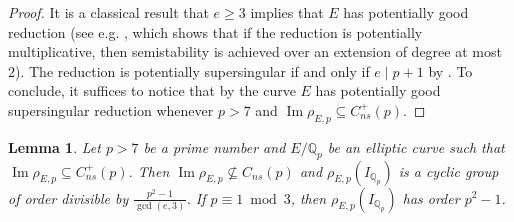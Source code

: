 \documentclass{amsart}
\newtheorem{lemma}[theorem]{Lemma}
\theoremstyle{definition}
\newcommand{\Q}{\mathbb{Q}}
\newcommand{\NRep}[1]{\operatorname{Im}\rho_{E,#1}}
\newcommand{\GoodReductionExtension}{K}
\numberwithin{theorem}{section}
\numberwithin{equation}{section}
\begin{document}
\begin{proof}
    It is a classical result that $e \geq 3$ implies that $E$ has potentially good reduction (see e.g. \cite[Theorem C.14.1(d)]{MR2514094}, which shows that if the reduction is potentially multiplicative, then semistability is achieved over an extension of degree at most $2$). The reduction is potentially supersingular if and only if $e \mid p+1$ by \cite[Remarque 2 on p.~112]{Volkov}.
    To conclude, it suffices to notice that by  the curve $E$ has potentially good supersingular reduction whenever $p>7$ and $\operatorname{Im}\rho_{E,p} \subseteq C_{ns}^+(p)$.
\end{proof}


\begin{lemma}\label{lemma: G(p) is not in the Cartan}
Let $p>7$ be a prime number and $E/\Q_p$ be an elliptic curve such that $\NRep{p} \subseteq C_{ns}^+(p)$. Then 
    $\NRep{p} \not\subseteq C_{ns}(p)$ and $\rho_{E, p}(I_{\Q_p})$ is a cyclic group of order divisible by $\frac{p^2-1}{\gcd(e, 3)}$. If $p \equiv 1 \bmod 3$, then $\rho_{E, p}(I_{\Q_p})$ has order $p^2-1$.
\end{lemma}
\end{document}
